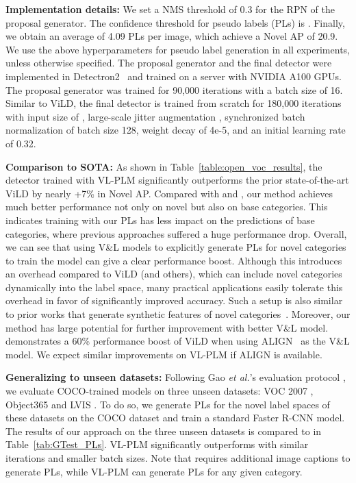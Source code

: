 \documentclass[runningheads]{llncs}
\begin{document}
\vspace{1mm}
\noindent \textbf{Implementation details:}
We set a NMS threshold of 0.3 for the RPN of the proposal generator. The confidence threshold for pseudo labels (PLs) is . Finally, we obtain an average of 4.09 PLs per image, which achieve a Novel AP of 20.9. We use the above hyperparameters for pseudo label generation in all experiments, unless otherwise specified.
The proposal generator and the final detector were implemented in Detectron2~\cite{wu2019detectron2} and trained on a server with NVIDIA A100 GPUs. The proposal generator was trained for 90,000 iterations with a batch size of 16. 
Similar to ViLD, the final detector is trained from scratch for 180,000 iterations with input size of , large-scale jitter augmentation \cite{ghiasi2021simple}, synchronized batch normalization of batch size 128, weight decay of 4e-5, and an initial learning rate of 0.32.


\vspace{1mm}
\noindent \textbf{Comparison to SOTA:} 
As shown in Table~\ref{table:open_voc_results}, the detector trained with VL-PLM significantly outperforms the prior state-of-the-art ViLD by nearly +7\% in Novel AP. 
Compared with \cite{zareian_cvpr_21} and \cite{gao2021open}, our method achieves much better performance not only on novel but also on base categories. This indicates training with our PLs has less impact on the predictions of base categories, where previous approaches suffered a huge performance drop.
Overall, we can see that using V\&L models to explicitly generate PLs for novel categories to train the model can give a clear performance boost.  Although this introduces an overhead compared to ViLD (and others), which can include novel categories dynamically into the label space, many practical applications easily tolerate this overhead in favor of significantly improved accuracy.
Such a setup is also similar to prior works that generate synthetic features of novel categories~\cite{zhu2020don}.
Moreover, our method has large potential for further improvement with better V\&L model.
\cite{gu_iclr_22} demonstrates a 60\% performance boost of ViLD when using ALIGN~\cite{jia_icml_21} as the V\&L model.
We expect similar improvements on VL-PLM if ALIGN is available.

\vspace{1mm}
\noindent \textbf{Generalizing to unseen datasets:} Following Gao \emph{et al.}'s evaluation protocol \cite{gao2021open}, we evaluate COCO-trained models on three unseen datasets: VOC 2007 \cite{everingham2015pascal}, Object365 \cite{Objects365} and LVIS \cite{gupta2019lvis}. To do so, we generate PLs for the novel label spaces of these datasets on the COCO dataset and train a standard Faster R-CNN model. The results of our approach on the three unseen datasets is compared to \cite{gao2021open} in Table~\ref{tab:GTest_PLs}. VL-PLM significantly outperforms \cite{gao2021open} with similar iterations and smaller batch sizes. Note that \cite{gao2021open} requires additional image captions to generate PLs, while VL-PLM can generate PLs for any given category.
\end{document}
